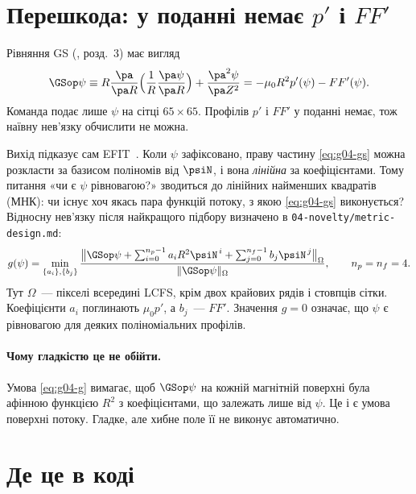 \section{Перешкода: у поданні немає \texorpdfstring{$p'$ і $FF'$}{p′ і FF′}}\label{sec:g04-obstacle}

Рівняння GS (\cite{Manual}, розд.~3) має вигляд
\begin{equation}\label{eq:g04-gs}
  \GSop\psi\equiv R\frac{\pa}{\pa R}\Big(\frac1R\frac{\pa\psi}{\pa R}\Big)+\frac{\pa^2\psi}{\pa Z^2}
  =-\mu_0R^2p'(\psi)-FF'(\psi).
\end{equation}
Команда подає лише $\psi$ на сітці $65\times65$. Профілів $p'$ і $FF'$ у поданні немає, тож наївну нев'язку обчислити не можна.

Вихід підказує сам EFIT~\cite{Lao1985}. Коли $\psi$ зафіксовано, праву частину \eqref{eq:g04-gs} можна розкласти за базисом поліномів від $\psiN$, і вона \emph{лінійна} за коефіцієнтами. Тому питання «чи є $\psi$ рівновагою?» зводиться до лінійних найменших квадратів (МНК): чи існує хоч якась пара функцій потоку, з якою \eqref{eq:g04-gs} виконується? Відносну нев'язку після найкращого підбору визначено в \texttt{04-novelty/metric-design.md}:
\begin{equation}\label{eq:g04-g}
  g(\psi)=\min_{\{a_i\},\{b_j\}}
  \frac{\big\|\GSop\psi+\sum_{i=0}^{n_p-1}a_iR^2\psiN^{\,i}+\sum_{j=0}^{n_f-1}b_j\psiN^{\,j}\big\|_{\Omega}}
       {\|\GSop\psi\|_{\Omega}},\qquad n_p=n_f=4 .
\end{equation}
Тут $\Omega$~--- пікселі всередині LCFS, крім двох крайових рядів і стовпців сітки. Коефіцієнти $a_i$ поглинають $\mu_0p'$, а $b_j$~--- $FF'$. Значення $g=0$ означає, що $\psi$ є рівновагою для деяких поліноміальних профілів.

\paragraph{Чому гладкістю це не обійти.} Умова \eqref{eq:g04-g} вимагає, щоб $\GSop\psi$ на кожній магнітній поверхні була афінною функцією $R^2$ з коефіцієнтами, що залежать лише від $\psi$. Це і є умова поверхні потоку. Гладке, але хибне поле її не виконує автоматично.

\section{Де це в коді}\label{sec:g04-code}


